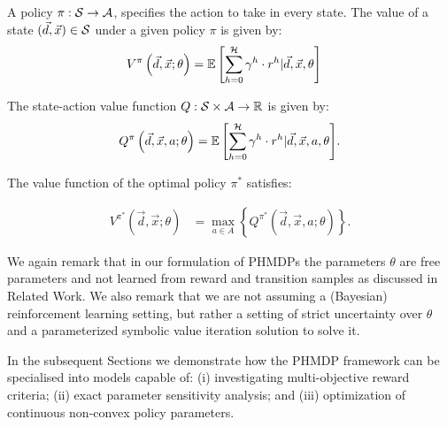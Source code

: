 A policy {\footnotesize $\pi : \mathcal{S} \rightarrow \mathcal{A}$}, specifies
the action to take in every state. The value of a state {\footnotesize
  $(\vec{d}, \vec{x}) \in \mathcal{S}$} under a given policy
{\footnotesize$\pi$} is given by: {\footnotesize
    \abovedisplayskip=0pt
    \belowdisplayskip=0pt
\begin{align*}
    V^{\pi}\left( \vec{d}, \vec{x}; \theta \right) &= {\mathbb{E}\left[{\sum\limits_{h = 0}^{\mathcal{H}} \gamma^h \cdot r^h | \vec{d}, \vec{x}, \theta}\right]} \nonumber  
\end{align*}
}

The state-action value function {\footnotesize$Q : \mathcal{S} \times \mathcal{A} \rightarrow \mathbb{R}$} is given by:
{\footnotesize 
    \abovedisplayskip=0pt
    \belowdisplayskip=0pt
\begin{align}
    \label{eq:mdp_qfunc}
    Q^{\pi}\left(\vec{d}, \vec{x}, a; \theta\right) = {\mathbb{E}\left[{\sum\limits_{h = 0}^{\mathcal{H}} \gamma^h \cdot r^h | \vec{d}, \vec{x}, a, \theta}\right]}. 
\end{align}
}

The value function of the optimal policy {\footnotesize$ \pi^{*} $} satisfies:

{\footnotesize 
\abovedisplayskip=0pt
\belowdisplayskip=0pt
\begin{align}
    \label{eq:opt_vfunc}
    V^{\pi^{*}}(\vec{d}, \vec{x}; \theta) &= \max_{a \in A} \left\{ Q^{\pi^{*}}(\vec{d}, \vec{x}, a; \theta) \right\}. 
\end{align}
}%

We again remark that in our formulation of PHMDPs the
parameters {\footnotesize $ \theta $} are free parameters and not
learned from reward and transition samples as discussed in Related Work.
We also remark that we are not assuming a (Bayesian) reinforcement learning setting,
but rather a setting of strict uncertainty over {\footnotesize $ \theta $} and
a parameterized symbolic value iteration solution to solve it.

In the subsequent Sections we demonstrate how the PHMDP framework can
be specialised into models capable of: (i) investigating
multi-objective reward criteria; (ii) exact parameter sensitivity
analysis; and (iii) optimization of continuous non-convex policy
parameters.

